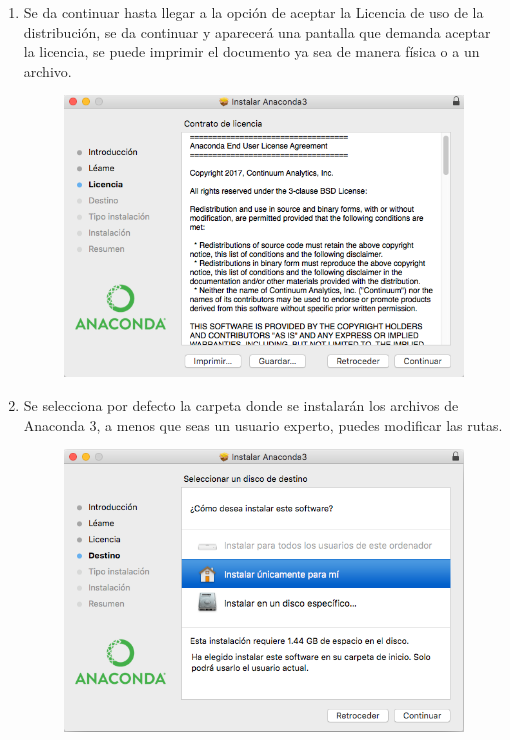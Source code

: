 \documentclass[12pt]{article}
\begin{document}
\begin{enumerate}
\item Se da continuar hasta llegar a la opción de aceptar la Licencia de uso de la distribución, se da continuar y aparecerá una pantalla que demanda aceptar la licencia, se puede imprimir el documento ya sea de manera física o a un archivo.
\begin{figure}[H]
	\centering
	\includegraphics[scale=0.5]{Imagenes/Instalacion_Anaconda_01_iOS_06} 
\end{figure}
\item Se selecciona por defecto la carpeta donde se instalarán los archivos de Anaconda 3, a menos que seas un usuario experto, puedes modificar las rutas.
\begin{figure}[H]
	\centering
	\includegraphics[scale=0.5]{Imagenes/Instalacion_Anaconda_01_iOS_07} 
\end{figure}

\end{enumerate}
\end{document}
